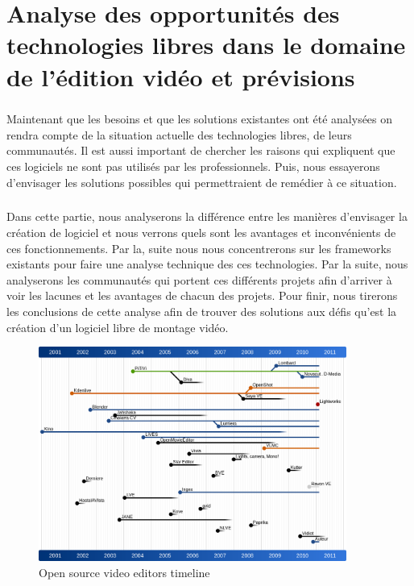 \chapter{Analyse des opportunités des technologies libres dans
le domaine de l'édition vidéo et prévisions}
\minitoc \mtcskip \newpage

\paragraph{}
Maintenant que les besoins et que les solutions existantes
ont été analysées on rendra compte de la
situation actuelle des technologies libres, de leurs communautés. Il est
aussi important de chercher les raisons qui expliquent que ces
logiciels ne sont pas utilisés par les professionnels. Puis, nous essayerons
d'envisager les solutions possibles qui permettraient de remédier à ce
situation.

\paragraph{}
Dans cette partie, nous analyserons la différence entre les
manières d'envisager la création de logiciel et nous verrons quels sont les
avantages et inconvénients de ces fonctionnements. Par la, suite nous
nous concentrerons sur les frameworks existants pour faire une analyse
technique des ces technologies. Par la suite, nous analyserons
les communautés qui portent ces différents projets afin d'arriver à
voir les lacunes et les avantages de chacun des projets.  Pour finir,
nous tirerons les conclusions de cette analyse afin de trouver des
solutions aux défis qu'est la création d'un logiciel libre de montage
vidéo.

\newpage
\begin{figure}
  \begin{center}
    \includegraphics[width=0.9\textwidth]{images/open-source-video-editor-timeline}
  \end{center} \caption{Open source video editors timeline} \label{Yes}
\end{figure}

